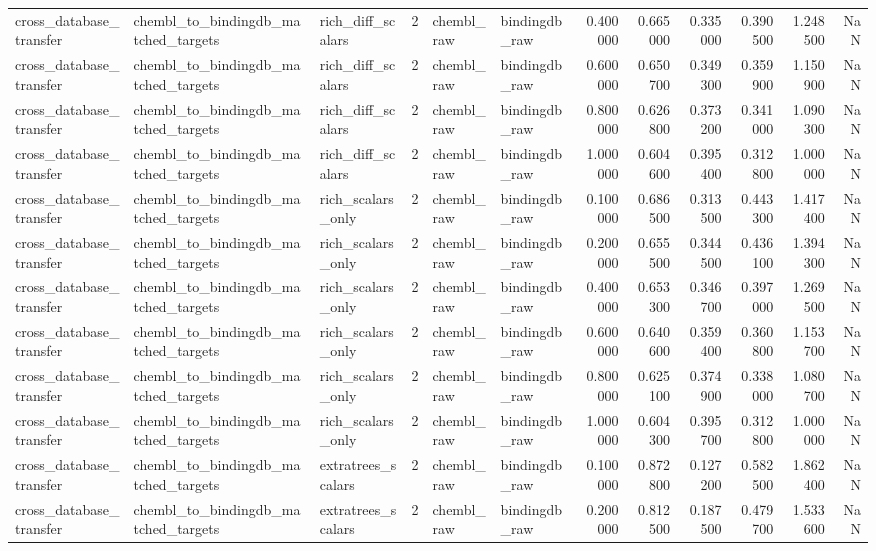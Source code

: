 \begin{longtable}{lllrllrrrrrr}
cross\_database\_transfer & chembl\_to\_bindingdb\_matched\_targets & rich\_diff\_scalars & 2 & chembl\_raw & bindingdb\_raw & 0.400000 & 0.665000 & 0.335000 & 0.390500 & 1.248500 & NaN \\
cross\_database\_transfer & chembl\_to\_bindingdb\_matched\_targets & rich\_diff\_scalars & 2 & chembl\_raw & bindingdb\_raw & 0.600000 & 0.650700 & 0.349300 & 0.359900 & 1.150900 & NaN \\
cross\_database\_transfer & chembl\_to\_bindingdb\_matched\_targets & rich\_diff\_scalars & 2 & chembl\_raw & bindingdb\_raw & 0.800000 & 0.626800 & 0.373200 & 0.341000 & 1.090300 & NaN \\
cross\_database\_transfer & chembl\_to\_bindingdb\_matched\_targets & rich\_diff\_scalars & 2 & chembl\_raw & bindingdb\_raw & 1.000000 & 0.604600 & 0.395400 & 0.312800 & 1.000000 & NaN \\
cross\_database\_transfer & chembl\_to\_bindingdb\_matched\_targets & rich\_scalars\_only & 2 & chembl\_raw & bindingdb\_raw & 0.100000 & 0.686500 & 0.313500 & 0.443300 & 1.417400 & NaN \\
cross\_database\_transfer & chembl\_to\_bindingdb\_matched\_targets & rich\_scalars\_only & 2 & chembl\_raw & bindingdb\_raw & 0.200000 & 0.655500 & 0.344500 & 0.436100 & 1.394300 & NaN \\
cross\_database\_transfer & chembl\_to\_bindingdb\_matched\_targets & rich\_scalars\_only & 2 & chembl\_raw & bindingdb\_raw & 0.400000 & 0.653300 & 0.346700 & 0.397000 & 1.269500 & NaN \\
cross\_database\_transfer & chembl\_to\_bindingdb\_matched\_targets & rich\_scalars\_only & 2 & chembl\_raw & bindingdb\_raw & 0.600000 & 0.640600 & 0.359400 & 0.360800 & 1.153700 & NaN \\
cross\_database\_transfer & chembl\_to\_bindingdb\_matched\_targets & rich\_scalars\_only & 2 & chembl\_raw & bindingdb\_raw & 0.800000 & 0.625100 & 0.374900 & 0.338000 & 1.080700 & NaN \\
cross\_database\_transfer & chembl\_to\_bindingdb\_matched\_targets & rich\_scalars\_only & 2 & chembl\_raw & bindingdb\_raw & 1.000000 & 0.604300 & 0.395700 & 0.312800 & 1.000000 & NaN \\
cross\_database\_transfer & chembl\_to\_bindingdb\_matched\_targets & extratrees\_scalars & 2 & chembl\_raw & bindingdb\_raw & 0.100000 & 0.872800 & 0.127200 & 0.582500 & 1.862400 & NaN \\
cross\_database\_transfer & chembl\_to\_bindingdb\_matched\_targets & extratrees\_scalars & 2 & chembl\_raw & bindingdb\_raw & 0.200000 & 0.812500 & 0.187500 & 0.479700 & 1.533600 & NaN \\

\end{longtable}
